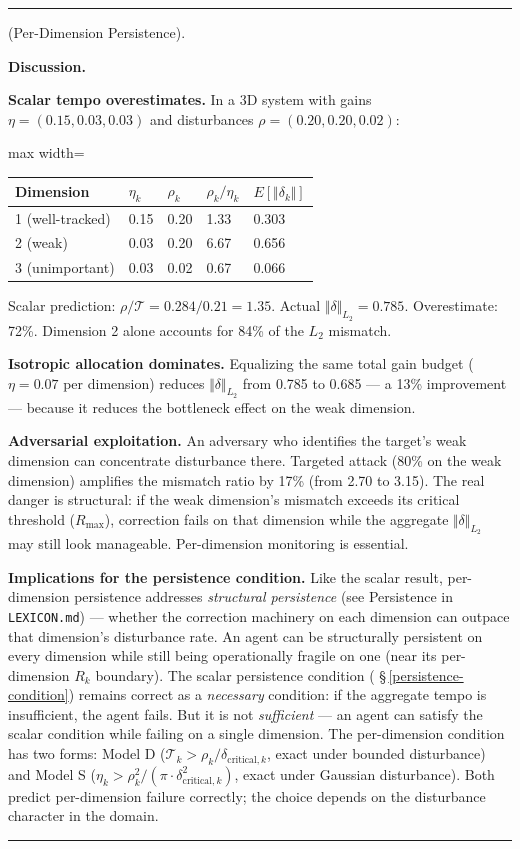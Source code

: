\documentclass[11pt,oneside]{article}
\newcounter{claim}[section]
\renewcommand{\theclaim}{\thesection.\arabic{claim}}
\newenvironment{segment}[2]{%
  \refstepcounter{claim}%
  \bigskip\noindent\hrule\smallskip
  \noindent{\bfseries #1~\theclaim}\enskip(#2).\par\smallskip
  \noindent\ignorespaces
}{%
  \par\smallskip\noindent\hrule\bigskip
}
\newenvironment{theorem}[1][]{\begin{segment}{Theorem}{#1}}{\end{segment}}
\begin{document}
\begin{theorem}[Per-Dimension Persistence]
\medskip\noindent\textbf{Discussion.}


\textbf{Scalar tempo overestimates.} In a 3D system with gains $\eta = (0.15, 0.03, 0.03)$ and disturbances $\rho = (0.20, 0.20, 0.02)$:

\begin{adjustbox}{max width=\textwidth}
\small
\begin{tabular}{lllll}
\toprule
Dimension & $\eta_k$ & $\rho_k$ & $\rho_k / \eta_k$ & $E[\Vert\delta_k\Vert]$ \\
\midrule
1 (well-tracked) & 0.15 & 0.20 & 1.33 & 0.303 \\
2 (weak) & 0.03 & 0.20 & 6.67 & 0.656 \\
3 (unimportant) & 0.03 & 0.02 & 0.67 & 0.066 \\
\bottomrule
\end{tabular}
\end{adjustbox}


Scalar prediction: $\rho / \mathcal{T} = 0.284 / 0.21 = 1.35$. Actual $\Vert\delta\Vert_{L_2} = 0.785$. Overestimate: 72\%. Dimension 2 alone accounts for 84\% of the $L_2$ mismatch.

\textbf{Isotropic allocation dominates.} Equalizing the same total gain budget ($\eta = 0.07$ per dimension) reduces $\Vert\delta\Vert_{L_2}$ from 0.785 to 0.685 — a 13\% improvement — because it reduces the bottleneck effect on the weak dimension.

\textbf{Adversarial exploitation.} An adversary who identifies the target's weak dimension can concentrate disturbance there. Targeted attack (80\% on the weak dimension) amplifies the mismatch ratio by 17\% (from 2.70 to 3.15). The real danger is structural: if the weak dimension's mismatch exceeds its critical threshold ($R_{\text{max}}$), correction fails on that dimension while the aggregate $\Vert\delta\Vert_{L_2}$ may still look manageable. Per-dimension monitoring is essential.

\textbf{Implications for the persistence condition.} Like the scalar result, per-dimension persistence addresses \textit{structural persistence} (see Persistence in \texttt{LEXICON.md}) — whether the correction machinery on each dimension can outpace that dimension's disturbance rate. An agent can be structurally persistent on every dimension while still being operationally fragile on one (near its per-dimension $R_k$ boundary). The scalar persistence condition ( \S\,\ref{persistence-condition}) remains correct as a \textit{necessary} condition: if the aggregate tempo is insufficient, the agent fails. But it is not \textit{sufficient} — an agent can satisfy the scalar condition while failing on a single dimension. The per-dimension condition has two forms: Model D ($\mathcal{T}_k > \rho_k/\delta_{\text{critical},k}$, exact under bounded disturbance) and Model S ($\eta_k > \rho_k^2/(\pi \cdot \delta_{\text{critical},k}^2)$, exact under Gaussian disturbance). Both predict per-dimension failure correctly; the choice depends on the disturbance character in the domain.


\end{theorem}
\end{document}
